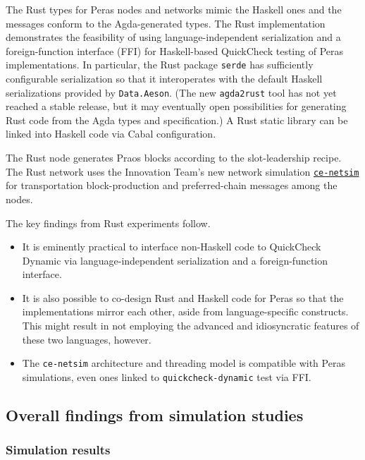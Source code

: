 \documentclass[10pt]{article}
\providecommand{\tightlist}{%
  \setlength{\itemsep}{0pt}\setlength{\parskip}{0pt}}
\begin{document}
The Rust types for Peras nodes and networks mimic the Haskell ones and
the messages conform to the Agda-generated types. The Rust
implementation demonstrates the feasibility of using
language-independent serialization and a foreign-function interface
(FFI) for Haskell-based QuickCheck testing of Peras implementations. In
particular, the Rust package \texttt{serde} has sufficiently
configurable serialization so that it interoperates with the default
Haskell serializations provided by \texttt{Data.Aeson}. (The new
\texttt{agda2rust} tool has not yet reached a stable release, but it may
eventually open possibilities for generating Rust code from the Agda
types and specification.) A Rust static library can be linked into
Haskell code via Cabal configuration.

The Rust node generates Praos blocks according to the slot-leadership
recipe. The Rust network uses the Innovation Team's new network
simulation
\href{https://github.com/input-output-hk/ce-netsim}{\color{blue}\texttt{ce-netsim}} for
transportation block-production and preferred-chain messages among the
nodes.

The key findings from Rust experiments follow.

\begin{itemize}
\tightlist
\item
  It is eminently practical to interface non-Haskell code to QuickCheck
  Dynamic via language-independent serialization and a foreign-function
  interface.
\item
  It is also possible to co-design Rust and Haskell code for Peras so
  that the implementations mirror each other, aside from
  language-specific constructs. This might result in not employing the
  advanced and idiosyncratic features of these two languages, however.
\item
  The \texttt{ce-netsim} architecture and threading model is compatible
  with Peras simulations, even ones linked to
  \texttt{quickcheck-dynamic} test via FFI.
\end{itemize}

\subsection{Overall findings from simulation
studies}\label{overall-findings-from-simulation-studies}

\subsubsection{Simulation results}\label{simulation-results}
\end{document}
